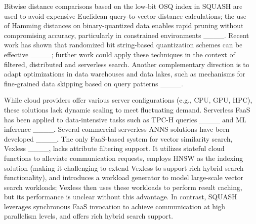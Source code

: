 Bitwise distance comparisons based on the low-bit OSQ index in SQUASH are used to avoid expensive Euclidean query-to-vector distance calculations;
the use of Hamming distances on binary-quantized data enables rapid pruning without compromising accuracy, particularly in constrained environments ____. Recent work has shown that randomized bit string-based quantization schemes can be effective ____; further work could apply these techniques in the context of filtered, distributed and serverless search. Another complementary direction is to adapt optimizations in data warehouses and data lakes, such as mechanisms for fine-grained data skipping based on query patterns ____.
 
While cloud providers offer various server configurations (e.g., CPU, GPU, HPC), these solutions lack dynamic scaling to meet fluctuating demand. Serverless FaaS has been applied to data-intensive tasks such as TPC-H queries ____ and ML inference ____. Several commercial serverless ANNS solutions have been developed ____.
The only FaaS-based system for vector similarity search, Vexless ____, lacks attribute filtering support. 
It utilizes stateful cloud functions to alleviate communication requests, employs HNSW as the indexing solution (making it challenging to extend Vexless to support rich hybrid search functionality), and introduces a workload generator to model large-scale vector search workloads; Vexless then uses these workloads to perform result caching, but its performance is unclear without this advantage.
In contrast, SQUASH leverages synchronous FaaS invocation to achieve communication at high parallelism levels, and offers rich hybrid search support.
